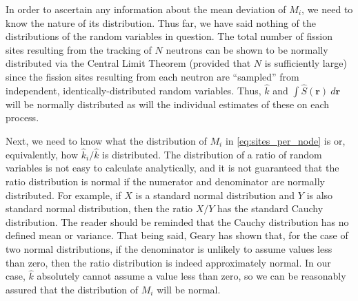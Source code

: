 In order to ascertain any information about the mean deviation of $M_i$, we need
to know the nature of its distribution. Thus far, we have said nothing of the
distributions of the random variables in question. The total number of fission
sites resulting from the tracking of $N$ neutrons can be shown to be normally
distributed via the Central Limit Theorem (provided that $N$ is sufficiently
large) since the fission sites resulting from each neutron are ``sampled'' from
independent, identically-distributed random variables. Thus, $\hat{k}$ and $\int
\hat{S} (\mathbf{r}) \: d\mathbf{r}$ will be normally distributed as will the
individual estimates of these on each process.

Next, we need to know what the distribution of $M_i$ in
\eqref{eq:sites_per_node} is or, equivalently, how $\hat{k}_i / \hat{k}$ is
distributed. The distribution of a ratio of random variables is not easy to
calculate analytically, and it is not guaranteed that the ratio distribution is
normal if the numerator and denominator are normally distributed. For example,
if $X$ is a standard normal distribution and $Y$ is also standard normal
distribution, then the ratio $X/Y$ has the standard Cauchy distribution. The
reader should be reminded that the Cauchy distribution has no defined mean or
variance. That being said, Geary \cite{jrss-geary-1930} has shown that, for the
case of two normal distributions, if the denominator is unlikely to assume
values less than zero, then the ratio distribution is indeed approximately
normal. In our case, $\hat{k}$ absolutely cannot assume a value less than zero,
so we can be reasonably assured that the distribution of $M_i$ will be normal.

